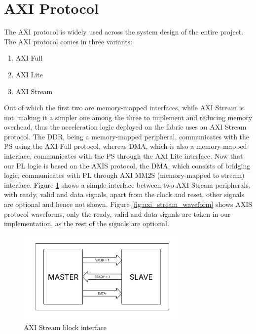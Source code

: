     \section{AXI Protocol}
    \noindent
    The AXI protocol is widely used across the system design of the entire project. The AXI protocol comes in three variants: 
    \begin{enumerate}
    \item AXI Full
    \item AXI Lite
    \item AXI Stream
    \end{enumerate}
    \noindent
    Out of which the first two are memory-mapped interfaces, while AXI Stream is not, making it a simpler one among the three to implement and reducing memory overhead, thus the acceleration logic deployed on the fabric uses an AXI Stream protocol. The DDR, being a memory-mapped peripheral, communicates with the PS using the AXI Full protocol, whereas DMA, which is also a memory-mapped interface, communicates with the PS through the AXI Lite interface. Now that our PL logic is based on the AXIS protocol, the DMA, which consists of bridging logic, communicates with PL through AXI MM2S (memory-mapped to stream) interface. Figure \ref{fig:AXI_Stream_block} shows a simple interface between two AXI Stream peripherals, with ready, valid and data signals, apart from the clock and reset, other signals are optional and hence not shown. Figure \ref{fig:axi_stream_waveform} shows AXIS protocol waveforms, only the ready, valid and data signals are taken in our implementation, as the rest of the signals are optional.

    \begin{figure}
        \centering
        \includegraphics[width=0.75\textwidth]{images/axi_image.png}
        \caption{AXI Stream block interface}
        \label{fig:AXI_Stream_block}
    \end{figure}

